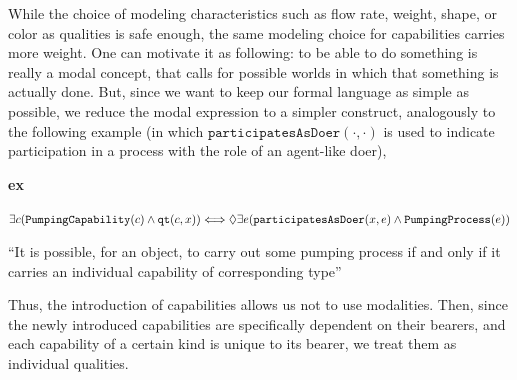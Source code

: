 \documentclass[sw]{iosart2x}
\newcommand{\bflist}{\begin{list}{}{\setlength{\topsep}{2mm}\setlength{\partopsep}{0mm}\setlength{\parsep}{0mm}\setlength{\leftmargin}{9mm}\setlength{\labelwidth}{8mm}}}
\newcommand{\eflist}{\end{list}}
\newcommand{\ExLabel}{\textrm{ex}}
\newcommand{\myex}[1]{\refstepcounter{cntex}\begin{small}{\bf \ExLabel\thecntex\label{ex:#1}}\end{small}}
\newcounter{cntex}
\newcommand{\mytext}[1]{``#1''}
\newcommand{\generalStyle}[1]{\texttt{#1}}
\newcommand{\biRel}[3]{\generalStyle{#1}(#2,#3)}
\newcommand{\uniRel}[2]{\generalStyle{#1}(#2)}
\newcommand{\myiff}{\Longleftrightarrow}
\newcommand{\DOLCEQualityDirect}[2]{\biRel{qt}{#1}{#2}}
\newcommand{\PumpingCapability}[1]{\uniRel{PumpingCapability}{#1}}
\newcommand{\PumpingProcess}[1]{\uniRel{PumpingProcess}{#1}}
\newcommand{\participateAsDoer}[2]{\biRel{participatesAsDoer}{#1}{#2}}
\newcommand{\TODO}[1]{{\color{red} #1}}
\begin{document}
While the choice of modeling characteristics such as flow rate, weight, shape, or color as qualities is safe enough, the same modeling choice for capabilities carries more weight. 
One can motivate it as following: to be able to do something is really a modal concept, that calls for possible worlds in which that something is actually done. 
But, since we want to keep our formal language as simple as possible, we reduce the modal expression to a simpler construct, analogously to the following example (in which $\participateAsDoer{\cdot}{\cdot}$ is used to indicate participation in a process with the role of an agent-like doer),
\bflist
\item[\myex{Capab}] $ \exists c(\PumpingCapability{c} \land \DOLCEQualityDirect{c}{x}) \myiff \\
\mbox{} \hfill
\lozenge \exists e(\participateAsDoer{x}{e} \land  \PumpingProcess{e}) $ 
\item \mytext{It is possible, for an object, to carry out some pumping process if and only if it carries an individual capability of corresponding type}
\eflist

Thus, the introduction of capabilities allows us not to use modalities. 
Then, since the newly introduced capabilities are specifically dependent on their bearers, and each capability of a certain kind is unique to its bearer, we treat them as individual qualities. 



\end{document}
